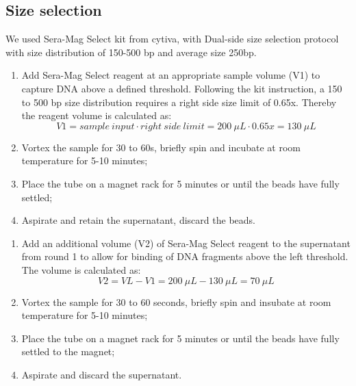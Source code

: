 \documentclass[a4paper, 12pt]{report}
\begin{document}
\subsection{Size selection}
\vspace{-1em}
We used Sera-Mag Select kit from cytiva, with Dual-side size selection protocol with size distribution of 150-500 bp and average size 250bp.
\vspace{-1.5em}
\begin{description}\setlength\itemsep{-0.2em}
	\item[Round 1]
	\begin{enumerate}\setlength\itemsep{-0.2em}
		\item Add Sera-Mag Select reagent at an appropriate sample volume (V1) to capture DNA above a defined threshold. Following the kit instruction, a  150 to 500 bp size distribution requires a right side size limit of 0.65x. Thereby the reagent volume is calculated as:
		\begin{equation}
			V1 = sample \  input \cdot  right \ side \ limit = 200 \ \mu L \cdot 0.65x  = 130 \ \mu L
		\end{equation}
		\item Vortex the sample for 30 to 60s, briefly spin and incubate at room temperature for 5-10 minutes;
		\item Place the tube on a magnet rack for 5 minutes or until the beads have fully settled;
		\item Aspirate and retain the supernatant, discard the beads.
	\end{enumerate}
	\item[Round 2]\begin{enumerate}\setlength\itemsep{-0.2em}
		\item Add an additional volume (V2) of Sera-Mag Select reagent to the supernatant from round 1 to allow for binding of DNA fragments above the left threshold. The volume is calculated as: 
		\begin{equation}
			V2 = VL - V1 = 200 \ \mu L - 130 \ \mu L = 70 \ \mu L
		\end{equation}
		\item Vortex the sample for 30 to 60 seconds, briefly spin and insubate at room temperature for 5-10 minutes;
		\item Place the tube on a magnet rack for 5 minutes or until the beads have fully settled to the magnet;
		\item Aspirate and discard the supernatant.
	\end{enumerate}

\end{description}
\end{document}
